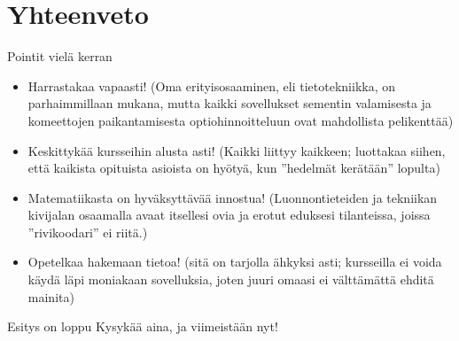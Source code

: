 \documentclass[pdf,9pt,handout]{beamer}
\begin{document}
\section{Yhteenveto}
\begin{frame}{Pointit vielä kerran}
\begin{itemize}
\item Harrastakaa vapaasti! (Oma erityisosaaminen, eli tietotekniikka,
  on parhaimmillaan mukana, mutta kaikki sovellukset sementin
  valamisesta ja komeettojen paikantamisesta optiohinnoitteluun ovat
  mahdollista pelikenttää)
\item Keskittykää kursseihin alusta asti! (Kaikki liittyy kaikkeen;
  luottakaa siihen, että kaikista opituista asioista on hyötyä, kun
  ''hedelmät kerätään'' lopulta)
\item Matematiikasta on hyväksyttävää innostua! (Luonnontieteiden ja
  tekniikan kivijalan osaamalla avaat itsellesi ovia ja erotut
  eduksesi tilanteissa, joissa ''rivikoodari'' ei riitä.)
\item Opetelkaa hakemaan tietoa! (sitä on tarjolla ähkyksi asti;
  kursseilla ei voida käydä läpi moniakaan sovelluksia, joten juuri
  omaasi ei välttämättä ehditä mainita)
  
\end{itemize}
\end{frame}

\begin{frame}{Esitys on loppu}
  Kysykää aina, ja viimeistään nyt!
\end{frame}
\end{document}
